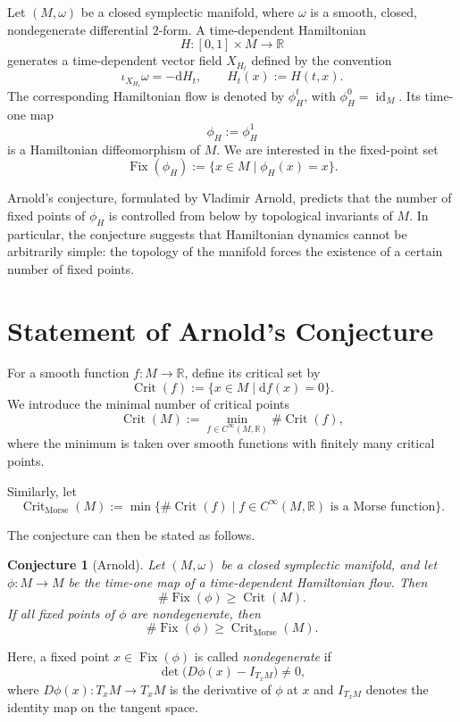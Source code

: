 \documentclass[11pt,a4paper]{article}
\theoremstyle{plain}
\newtheorem{conjecture}[theorem]{Conjecture}
\theoremstyle{definition}
\theoremstyle{remark}
\newcommand{\R}{\mathbb{R}}
\newcommand{\id}{\operatorname{id}}
\newcommand{\Fix}{\operatorname{Fix}}
\newcommand{\Crit}{\operatorname{Crit}}
\newcommand{\CritMorse}{\operatorname{Crit}_{\mathrm{Morse}}}
\newcommand{\d}{\mathrm{d}}
\begin{document}
	Let $(M,\omega)$ be a closed symplectic manifold, where
	$\omega$ is a smooth, closed, nondegenerate differential
	$2$-form. A time-dependent Hamiltonian
	\[
	H\colon [0,1]\times M\longrightarrow \R
	\]
	generates a time-dependent vector field $X_{H_t}$ defined by
	the convention
	\[
	\iota_{X_{H_t}}\omega=-\d H_t,
	\qquad H_t(x):=H(t,x).
	\]
	The corresponding Hamiltonian flow is denoted by
	$\phi_H^t$, with $\phi_H^0=\id_M$. Its time-one map
	\[
	\phi_H:=\phi_H^1
	\]
	is a Hamiltonian diffeomorphism of $M$. We are interested
	in the fixed-point set
	\[
	\Fix(\phi_H)
	:=
	\{x\in M\mid \phi_H(x)=x\}.
	\]
	
	Arnold's conjecture, formulated by Vladimir Arnold, predicts
	that the number of fixed points of $\phi_H$ is controlled
	from below by topological invariants of $M$. In particular,
	the conjecture suggests that Hamiltonian dynamics cannot
	be arbitrarily simple: the topology of the manifold forces
	the existence of a certain number of fixed points.
	
	\section{Statement of Arnold's Conjecture}
	
	For a smooth function $f\colon M\to\R$, define its critical
	set by
	\[
	\Crit(f)
	:=
	\{x\in M\mid \d f(x)=0\}.
	\]
	We introduce the minimal number of critical points
	\[
	\Crit(M)
	:=
	\min_{f\in C^\infty(M,\R)}
	\#\Crit(f),
	\]
	where the minimum is taken over smooth functions with
	finitely many critical points.
	
	Similarly, let
	\[
	\CritMorse(M)
	:=
	\min\bigl\{
	\#\Crit(f)\mid
	f\in C^\infty(M,\R)
	\text{ is a Morse function}
	\bigr\}.
	\]
	
	The conjecture can then be stated as follows.
	
	\begin{conjecture}[Arnold]
		\label{conj:arnold}
		Let $(M,\omega)$ be a closed symplectic manifold, and let
		$\phi\colon M\to M$ be the time-one map of a
		time-dependent Hamiltonian flow. Then
		\[
		\boxed{
			\#\Fix(\phi)\geq \Crit(M).
		}
		\]
		If all fixed points of $\phi$ are nondegenerate, then
		\[
		\boxed{
			\#\Fix(\phi)\geq \CritMorse(M).
		}
		\]
	\end{conjecture}
	
	Here, a fixed point $x\in\Fix(\phi)$ is called
	\emph{nondegenerate} if
	\[
	\det\bigl(D\phi(x)-I_{T_xM}\bigr)\neq 0,
	\]
	where $D\phi(x)\colon T_xM\to T_xM$ is the derivative
	of $\phi$ at $x$ and $I_{T_xM}$ denotes the identity
	map on the tangent space.
	
\end{document}
